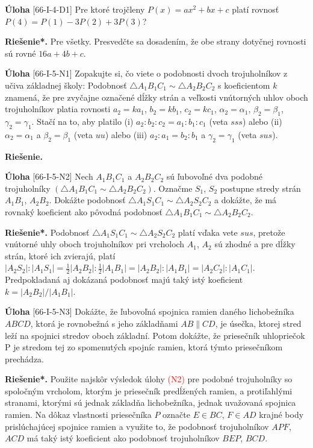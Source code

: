 \documentclass{article}
\newcommand{\rie}{\textbf{Riešenie.} }
\newcommand{\rieh}{\textbf{Riešenie*.} }
\newcommand\todo[1]{\noindent\textcolor{red}{(#1)}}
\newcommand{\problem}[3]{
  \begin{tcolorbox}[breakable,notitle,boxrule=0pt,colback=light-gray,colframe=light-gray]
    \textbf{Úloha}
    [#1] #2
  \end{tcolorbox}
  \noindent#3
}
\begin{document}
\problem{66-I-4-D1}{
Pre ktoré trojčleny $P(x) = ax^2+ bx + c$ platí rovnosť $P(4) = P(1) - 3P(2) + 3P(3)$?
}{
\rieh Pre všetky. Presvedčte sa dosadením, že obe strany dotyčnej rovnosti sú rovné $16a + 4b + c.$
}



\problem{66-I-5-N1}{
Zopakujte si, čo viete o podobnosti dvoch trojuholníkov z učiva základnej školy: Podobnosť $\triangle A_1B_1C_1 \sim  \triangle A_2B_2C_2$ s koeficientom $k$ znamená, že pre zvyčajne označené dĺžky strán a veľkosti vnútorných uhlov oboch trojuholníkov platia rovnosti $a_2 = ka_1$, $b_2 = kb_1$, $c_2 = kc_1$, $\alpha_2 = \alpha_1$, $\beta_2 = \beta_1$, $\gamma_2 = \gamma_1$. Stačí na to, aby platilo (i) $a_2 : b_2 : c_2 = a_1 : b_1 : c_1$ (veta $sss$) alebo (ii) $\alpha_2 = \alpha_1$ a $\beta_2 = \beta_1$ (veta $uu$) alebo (iii) $a_2 : a_1 = b_2 : b_1$ a $\gamma_2 = \gamma_1$ (veta $sus$).
}{
\rie 
}

\problem{66-I-5-N2}{
Nech $A_1 B_1 C_1$ a $A_2 B_2 C_2$ sú ľubovoľné dva podobné trojuholníky $(\triangle A_1 B_1 C_1 \sim \triangle A_2 B_2 C_2)$.  Označme $S_1$, $S_2$ postupne stredy strán $A_1 B_1$, $A_2 B_2$. Dokážte podobnosť $\triangle A_1 S_1 C_1 \sim \triangle A_2 S_2 C_2$ a dokážte, že má rovnaký koeficient ako pôvodná podobnosť $\triangle A_1 B_1 C_1 \sim \triangle A_2 B_2 C_2$. 
}{
\rieh Podobnosť $\triangle A_1 S_1 C_1 \sim \triangle A_2 S_2 C_2$ platí vďaka vete $sus$, pretože vnútorné uhly oboch trojuholníkov pri vrcholoch $A_1$, $A_2$ sú zhodné a pre dĺžky strán, ktoré ich zvierajú, platí $|A_2 S_2 | : |A_1 S_1 | = \frac{1}{2}|A_2 B_2 | : \frac{1}{2}|A_1 B_1 |= |A_2 B_2 | : |A_1 B_1| = |A_2 C_2 | : |A_1 C_1 |$. Predpokladaná aj dokázaná podobnosť majú taký istý koeficient $k = |A_2 B_2|/|A_1 B_1|$.
}

\problem{66-I-5-N3}{
Dokážte, že ľubovoľná spojnica ramien daného lichobežníka $ABCD$, ktorá je rovnobežná s jeho základňami $AB \parallel CD$, je úsečka, ktorej stred leží na spojnici stredov oboch základní. Potom dokážte, že priesečník uhlopriečok P je stredom tej zo spomenutých spojníc ramien, ktorá týmto priesečníkom prechádza.
}{
\rieh Použite najskôr výsledok úlohy \todo{N2} pre podobné trojuholníky so spoločným vrcholom, ktorým je priesečník predĺžených ramien, a protiľahlými stranami, ktorými sú jednak základňa lichobežníka, jednak uvažovaná spojnica ramien. Na dôkaz vlastnosti priesečníka $P$ označte $E \in BC$, $F \in AD$ krajné body prislúchajúcej spojnice ramien a využite to, že podobnosť trojuholníkov $APF$, $ACD$ má taký istý koeficient ako podobnosť trojuholníkov $BEP$, $BCD$.
}
\end{document}
